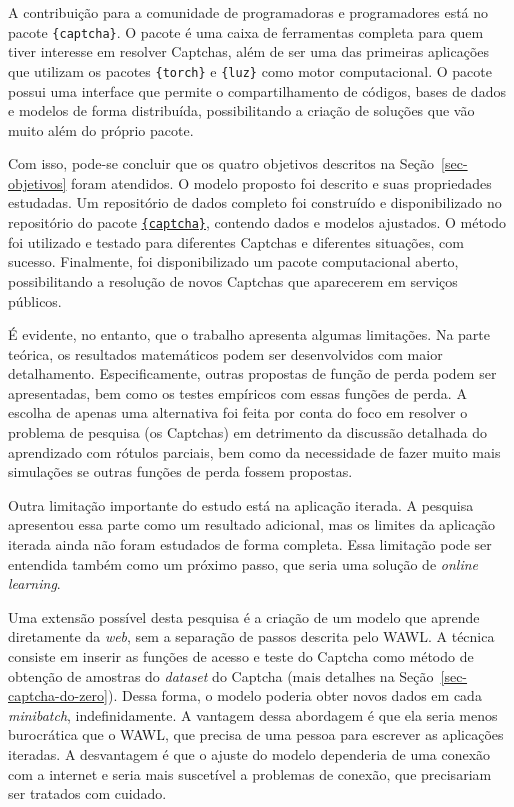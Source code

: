 \documentclass[12pt,twoside,brazilian]{book}
\begin{document}
A contribuição para a comunidade de programadoras e programadores está
no pacote \texttt{\{captcha\}}. O pacote é uma caixa de ferramentas
completa para quem tiver interesse em resolver Captchas, além de ser uma
das primeiras aplicações que utilizam os pacotes \texttt{\{torch\}} e
\texttt{\{luz\}} como motor computacional. O pacote possui uma interface
que permite o compartilhamento de códigos, bases de dados e modelos de
forma distribuída, possibilitando a criação de soluções que vão muito
além do próprio pacote.

Com isso, pode-se concluir que os quatro objetivos descritos na
Seção~\ref{sec-objetivos} foram atendidos. O modelo proposto foi
descrito e suas propriedades estudadas. Um repositório de dados completo
foi construído e disponibilizado no repositório do pacote
\href{https://github.com/decryptr/captcha/releases}{\texttt{\{captcha\}}},
contendo dados e modelos ajustados. O método foi utilizado e testado
para diferentes Captchas e diferentes situações, com sucesso.
Finalmente, foi disponibilizado um pacote computacional aberto,
possibilitando a resolução de novos Captchas que aparecerem em serviços
públicos.

É evidente, no entanto, que o trabalho apresenta algumas limitações. Na
parte teórica, os resultados matemáticos podem ser desenvolvidos com
maior detalhamento. Especificamente, outras propostas de função de perda
podem ser apresentadas, bem como os testes empíricos com essas funções
de perda. A escolha de apenas uma alternativa foi feita por conta do
foco em resolver o problema de pesquisa (os Captchas) em detrimento da
discussão detalhada do aprendizado com rótulos parciais, bem como da
necessidade de fazer muito mais simulações se outras funções de perda
fossem propostas.

Outra limitação importante do estudo está na aplicação iterada. A
pesquisa apresentou essa parte como um resultado adicional, mas os
limites da aplicação iterada ainda não foram estudados de forma
completa. Essa limitação pode ser entendida também como um próximo
passo, que seria uma solução de \emph{online learning}.

Uma extensão possível desta pesquisa é a criação de um modelo que
aprende diretamente da \emph{web}, sem a separação de passos descrita
pelo WAWL. A técnica consiste em inserir as funções de acesso e teste do
Captcha como método de obtenção de amostras do \emph{dataset} do Captcha
(mais detalhes na Seção~\ref{sec-captcha-do-zero}). Dessa forma, o
modelo poderia obter novos dados em cada \emph{minibatch},
indefinidamente. A vantagem dessa abordagem é que ela seria menos
burocrática que o WAWL, que precisa de uma pessoa para escrever as
aplicações iteradas. A desvantagem é que o ajuste do modelo dependeria
de uma conexão com a internet e seria mais suscetível a problemas de
conexão, que precisariam ser tratados com cuidado.
\end{document}
